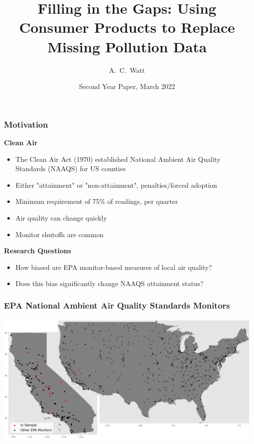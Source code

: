\documentclass{beamer}
\title[Missing Pollution Data] %
{Filling in the Gaps: Using Consumer Products to Replace Missing Pollution Data}
\author[Watt, Aaron] %
{A.~C.~Watt\inst{1}}
\institute[UCB] %
{
  \inst{1}%
  Agricultural \& Resource Economics\\
  University of California, Berkeley
}
\date[SYP 2022] %
{Second Year Paper, March 2022}
\begin{document}
\frame{\titlepage}


\begin{frame}
\frametitle{Motivation}
\textbf{Clean Air} 

\begin{itemize}
    \item The Clean Air Act (1970) established National Ambient Air Quality Standards
    (NAAQS) for US counties
    \item Either "attainment" or "non-attainment", penalties/forced adoption
    \item Minimum requirement of 75\% of readings, per quarter
    \item Air quality can change quickly
    \item Monitor shutoffs are common
\end{itemize}
\vspace{2em}
\textbf{Research Questions}
\begin{itemize}
\item How biased are EPA monitor-based measures of local air quality?
\item Does this bias significantly change NAAQS attainment status?
\end{itemize}

\end{frame}



\begin{frame}
\frametitle{EPA National Ambient Air Quality Standards Monitors}

\includegraphics[width=\textwidth]{output/figures/epa/combined_uc_cali_epa.png}
\end{frame}
\end{document}
